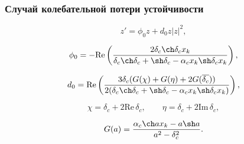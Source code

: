 \documentclass[fullscreen=true, unicode, bookmarks=false]{beamer}
\begin{document}
\begin{frame}
\frametitle{ Случай колебательной потери устойчивости }

\begin{equation}
	z' = \phi_0 z + d_0 z |z|^2,
\end{equation}

\bigskip

$$ \phi_0 = -\mbox{Re} \left(\dfrac{2 \delta_c \ch \delta_c x_k}{\delta_c\ch \delta_c + \sh \delta_c - \alpha_c x_k \sh \delta_c x_k} \right), $$

$$ d_0 = \mbox{Re} \left( \dfrac{3 \delta_c (G(\chi) + G(\eta) + 2G(\overline{\delta_c}) )}{2(\delta_c\ch \delta_c + \sh \delta_c - \alpha_c x_k \sh \delta_c x_k)} \right), $$

\bigskip
\pause

$$ \chi = \delta_c + 2 \mbox{Re}\,\delta_c, \qquad \eta = \delta_c + 2 \mbox{Im}\,\delta_c, $$

$$ G(a) = \dfrac{\alpha_c \ch a x_k - a \sh a}{a^2 - \delta_c^2}. $$

\end{frame}
\end{document}
